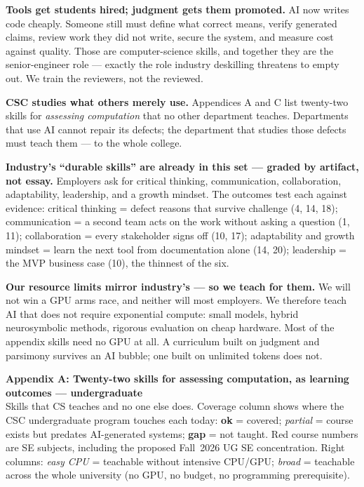 \documentclass[10pt]{article}
\newcommand{\se}[1]{\textcolor{sered}{#1}}
\begin{document}
\textbf{Tools get students hired; judgment gets them promoted.} AI now writes code cheaply. Someone still must define what correct means, verify generated claims, review work they did not write, secure the system, and measure cost against quality. Those are computer-science skills, and together they are the senior-engineer role --- exactly the role industry deskilling threatens to empty out. We train the reviewers, not the reviewed.

\textbf{CSC studies what others merely use.} Appendices A and C list twenty-two skills for \emph{assessing computation} that no other department teaches. Departments that use AI cannot repair its defects; the department that studies those defects must teach them --- to the whole college.

\textbf{Industry's ``durable skills'' are already in this set --- graded by artifact, not essay.} Employers ask for critical thinking, communication, collaboration, adaptability, leadership, and a growth mindset. The outcomes test each against evidence: critical thinking = defect reasons that survive challenge (4, 14, 18); communication = a second team acts on the work without asking a question (1, 11); collaboration = every stakeholder signs off (10, 17); adaptability and growth mindset = learn the next tool from documentation alone (14, 20); leadership = the MVP business case (10), the thinnest of the six.

\textbf{Our resource limits mirror industry's --- so we teach for them.} We will not win a GPU arms race, and neither will most employers. We therefore teach AI that does not require exponential compute: small models, hybrid neurosymbolic methods, rigorous evaluation on cheap hardware. Most of the appendix skills need no GPU at all. A curriculum built on judgment and parsimony survives an AI bubble; one built on unlimited tokens does not.

\newpage

{\large\bfseries Appendix A: Twenty-two skills for assessing computation, as learning outcomes --- undergraduate}\\[1pt]
{\small Skills that CS teaches and no one else does. Coverage column shows where the CSC undergraduate program touches each today: \textbf{ok} = covered; \emph{partial} = course exists but predates AI-generated systems; \textcolor{rule}{\textbf{gap}} = not taught. \se{Red course numbers} are SE subjects, including the proposed Fall~2026 UG SE concentration. Right columns: \emph{easy CPU} = teachable without intensive CPU/GPU; \emph{broad} = teachable across the whole university (no GPU, no budget, no programming prerequisite).}
\end{document}
